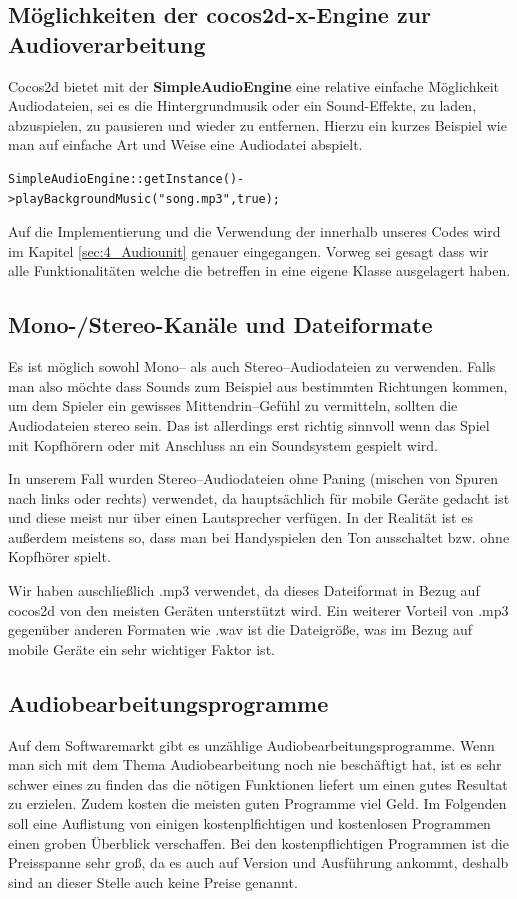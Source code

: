 \subsection{Möglichkeiten der cocos2d-x-Engine zur Audioverarbeitung}
Cocos2d bietet mit der \textbf{SimpleAudioEngine} eine relative einfache Möglichkeit Audio\-dateien, sei es die Hintergrundmusik oder ein Sound-Effekte, zu laden, abzuspielen, zu pausieren und wieder zu entfernen. Hierzu ein kurzes Beispiel wie man auf einfache Art und Weise eine Audiodatei abspielt.

\begin{lstlisting}[style=singleline]
SimpleAudioEngine::getInstance()->playBackgroundMusic("song.mp3",true);
\end{lstlisting}

Auf die Implementierung und die Verwendung der  innerhalb unseres Codes wird im Kapitel \ref{sec:4_Audiounit} genauer eingegangen. Vorweg sei gesagt dass wir alle Funktionalitäten welche die  betreffen in eine eigene Klasse  ausgelagert haben.


\subsection{Mono-/Stereo-Kanäle und Dateiformate}
Es ist möglich sowohl Mono-- als auch Stereo--Audiodateien zu verwenden. Falls man also möchte dass Sounds zum Beispiel aus bestimmten Richtungen kommen, um dem Spieler ein gewisses Mittendrin--Gefühl zu vermitteln, sollten die Audiodateien stereo sein. Das ist allerdings erst richtig sinnvoll wenn das Spiel mit Kopfhörern oder mit Anschluss an ein Soundsystem gespielt wird. 

In unserem Fall wurden Stereo--Audiodateien ohne Paning (mischen von Spuren nach links oder rechts) verwendet, da \gamename hauptsächlich für mobile Geräte gedacht ist und diese meist nur über einen Lautsprecher verfügen. In der Realität ist es außerdem meistens so, dass man bei Handyspielen den Ton ausschaltet bzw. ohne Kopfhörer spielt.

Wir haben auschließlich .mp3 verwendet, da dieses Dateiformat in Bezug auf cocos2d von den meisten Geräten unterstützt wird. Ein weiterer Vorteil von .mp3 gegenüber anderen Formaten wie .wav ist die Dateigröße, was im Bezug auf mobile Geräte ein sehr wichtiger Faktor ist.


\subsection{Audiobearbeitungsprogramme}
Auf dem Softwaremarkt gibt es unzählige Audiobearbeitungsprogramme. Wenn man sich mit dem Thema Audiobearbeitung noch nie beschäftigt hat, ist es sehr schwer eines zu finden das die nötigen Funktionen liefert um einen gutes Resultat zu erzielen. Zudem kosten die meisten guten Programme viel Geld. Im Folgenden soll eine Auflistung von einigen kostenplfichtigen und kostenlosen Programmen einen groben Überblick verschaffen. Bei den kostenpflichtigen Programmen ist die Preisspanne sehr groß, da es auch auf Version und Ausführung ankommt, deshalb sind an dieser Stelle auch keine Preise genannt.

